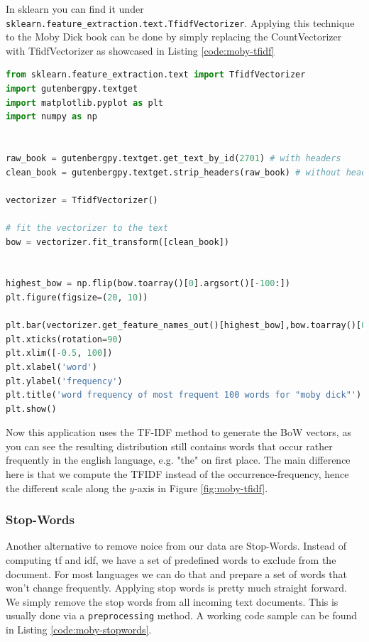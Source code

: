 In sklearn you can find it under \lstinline{sklearn.feature_extraction.text.TfidfVectorizer}.
Applying this technique to the Moby Dick book can be done by simply replacing the CountVectorizer with TfidfVectorizer as showcased in Listing \ref{code:moby-tfidf}
\begin{lstlisting}[language=Python, caption={word-frequency histogram for Moby Dick using TF-IDF}, label={code:moby-tfidf}]
from sklearn.feature_extraction.text import TfidfVectorizer
import gutenbergpy.textget
import matplotlib.pyplot as plt
import numpy as np


raw_book = gutenbergpy.textget.get_text_by_id(2701) # with headers
clean_book = gutenbergpy.textget.strip_headers(raw_book) # without headers

vectorizer = TfidfVectorizer()

# fit the vectorizer to the text
bow = vectorizer.fit_transform([clean_book])


highest_bow = np.flip(bow.toarray()[0].argsort()[-100:])
plt.figure(figsize=(20, 10))

plt.bar(vectorizer.get_feature_names_out()[highest_bow],bow.toarray()[0][highest_bow])
plt.xticks(rotation=90)
plt.xlim([-0.5, 100])
plt.xlabel('word')
plt.ylabel('frequency')
plt.title('word frequency of most frequent 100 words for "moby dick"')
plt.show()
\end{lstlisting}


Now this application uses the TF-IDF method to generate the BoW vectors, as you can see the resulting distribution still contains words that occur rather frequently in the english language, e.g. "the" on first place.
The main difference here is that we compute the TFIDF instead of the occurrence-frequency, hence the different scale along the $y$-axis in Figure \ref{fig:moby-tfidf}.
\subsubsection{Stop-Words}
Another alternative to remove noice from our data are Stop-Words.
Instead of computing tf and idf, we have a set of predefined words to exclude from the document.
For most languages we can do that and prepare a set of words that won't change frequently.
Applying stop words is pretty much straight forward. We simply remove the stop words from all incoming text documents.
This is usually done via a \lstinline{preprocessing} method.
A working code sample can be found in Listing \ref{code:moby-stopwords}.

